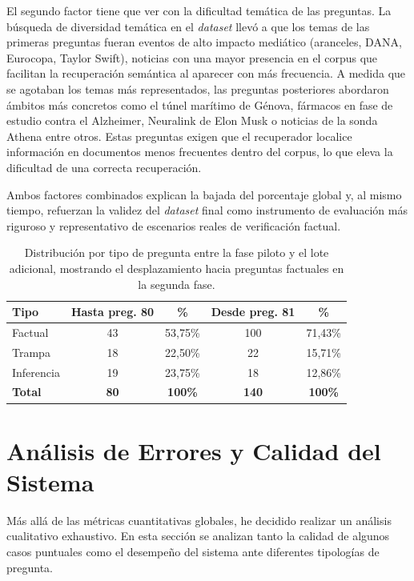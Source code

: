 El segundo factor tiene que ver con la dificultad temática de las preguntas. La búsqueda de diversidad temática en el \textit{dataset} llevó a que los temas de las primeras preguntas fueran eventos de alto impacto mediático (aranceles, DANA, Eurocopa, Taylor Swift), noticias con una mayor presencia en el corpus que facilitan la recuperación semántica al aparecer con más frecuencia. A medida que se agotaban los temas más representados, las preguntas posteriores abordaron ámbitos más concretos como el túnel marítimo de Génova, fármacos en fase de estudio contra el Alzheimer, Neuralink de Elon Musk o noticias de la sonda Athena entre otros. Estas preguntas exigen que el recuperador localice información en documentos menos frecuentes dentro del corpus, lo que eleva la dificultad de una correcta recuperación.

Ambos factores combinados explican la bajada del porcentaje global y, al mismo tiempo, refuerzan la validez del \textit{dataset} final como instrumento de evaluación más riguroso y representativo de escenarios reales de verificación factual.

\begin{table}[h]
\centering
\begin{tabular}{@{}lcccc@{}}
\toprule
\textbf{Tipo} & 
\textbf{Hasta preg. 80} & 
\textbf{\%} & 
\textbf{Desde preg. 81} & 
\textbf{\%} \\ \midrule
Factual    & 43 & 53,75\% & 100 & 71,43\% \\
Trampa     & 18 & 22,50\% & 22  & 15,71\% \\
Inferencia & 19 & 23,75\% & 18  & 12,86\% \\
\midrule
\textbf{Total} & \textbf{80} & \textbf{100\%} & 
\textbf{140} & \textbf{100\%} \\
\bottomrule
\end{tabular}
\caption{Distribución por tipo de pregunta entre la fase piloto y el lote adicional, mostrando el desplazamiento hacia preguntas factuales en la segunda fase.}
\label{tab:distribucion_dataset}
\end{table}
\newpage
\section{Análisis de Errores y Calidad del Sistema}

Más allá de las métricas cuantitativas globales, he decidido realizar un análisis cualitativo exhaustivo. En esta sección se analizan tanto la calidad de algunos casos puntuales como el desempeño del sistema ante diferentes tipologías de pregunta.

